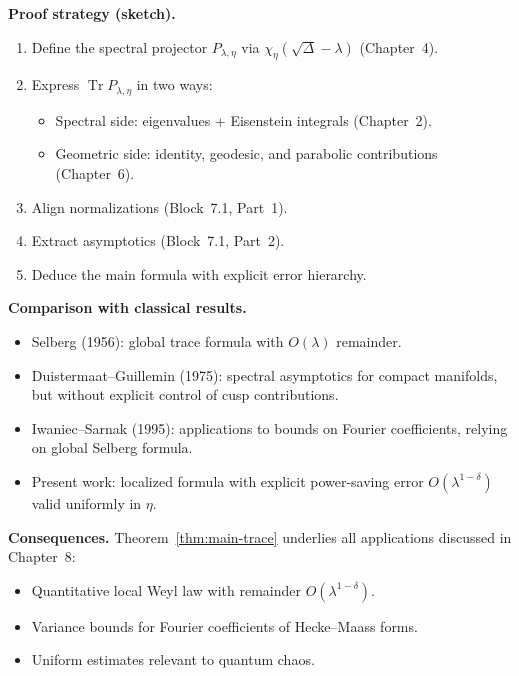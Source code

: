 \noindent\textbf{Proof strategy (sketch).}
\begin{enumerate}
  \item Define the spectral projector $P_{\lambda,\eta}$ via $\chi_\eta(\sqrt{\Delta}-\lambda)$ (Chapter~4).
  \item Express $\operatorname{Tr} P_{\lambda,\eta}$ in two ways:
    \begin{itemize}
      \item Spectral side: eigenvalues + Eisenstein integrals (Chapter~2).
      \item Geometric side: identity, geodesic, and parabolic contributions (Chapter~6).
    \end{itemize}
  \item Align normalizations (Block~7.1, Part~1).
  \item Extract asymptotics (Block~7.1, Part~2).
  \item Deduce the main formula with explicit error hierarchy.
\end{enumerate}

\medskip

\noindent\textbf{Comparison with classical results.}
\begin{itemize}
  \item Selberg (1956): global trace formula with $O(\lambda)$ remainder.
  \item Duistermaat--Guillemin (1975): spectral asymptotics for compact manifolds, but without explicit control of cusp contributions.
  \item Iwaniec--Sarnak (1995): applications to bounds on Fourier coefficients, relying on global Selberg formula.
  \item Present work: localized formula with explicit power-saving error $O(\lambda^{1-\delta})$ valid uniformly in $\eta$.
\end{itemize}

\medskip

\noindent\textbf{Consequences.}
Theorem~\ref{thm:main-trace} underlies all applications discussed in Chapter~8:
\begin{itemize}
  \item Quantitative local Weyl law with remainder $O(\lambda^{1-\delta})$.
  \item Variance bounds for Fourier coefficients of Hecke–Maass forms.
  \item Uniform estimates relevant to quantum chaos.
\end{itemize}

\medskip

